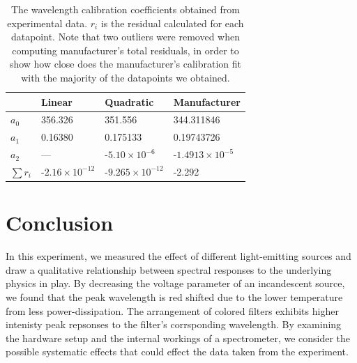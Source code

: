 \documentclass[authoryear, 12pt,5p, times]{elsarticle}
\begin{document}
%
\begin{table}
    \begin{tabular}{|l|l|l|l|}
    \hline
    ~                            & Linear                             & Quadratic                        & Manufacturer\\ \hline
    $a_0$                     & 356.326                              & 351.556                              & 344.311846                              \\ \hline
    $a_1$                     & 0.16380                              & 0.175133                             & 0.19743726                              \\ \hline
    $a_2$                     & ---                                  & -$5.10\times10^{-6}$   &-$1.4913\times10^{-5}$    \\ \hline
    $\sum r_i$ & -$2.16\times10^{-12}$ & -$9.265\times10^{-12}$ & -2.292                                  \\ \hline
    \end{tabular}
    \caption{The wavelength calibration coefficients obtained from experimental data. $r_i$ is the residual calculated for each datapoint. Note that two outliers were removed when computing manufacturer's total residuals, in order to show how close does the manufacturer's calibration fit with the majority of the datapoints we obtained.}
    \label{table}
\end{table}
\section{Conclusion}
In this experiment, we measured the effect of different light-emitting sources and draw a qualitative relationship between spectral responses to the underlying physics in play. By decreasing the voltage parameter of an incandescent source, we found that the peak wavelength is red shifted due to the lower temperature from less power-dissipation. The arrangement of colored filters exhibits higher intenisty peak repsonses to the filter's corrsponding wavelength. By examining the hardware setup and the internal workings of a spectrometer, we consider the possible systematic effects that could effect the data taken from the experiment. 
\end{document}
